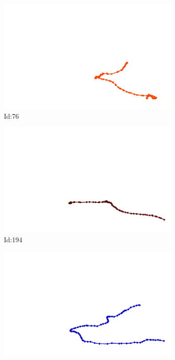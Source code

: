 \documentclass[12pt,twoside]{report}
\begin{document}
\begin{figure}
\centering
\begin{subfigure}[b]{0.20\textwidth}
\centering
\includegraphics[width=\textwidth]{../trajectories/76.png}
\caption{Id:76}
\end{subfigure}
\begin{subfigure}[b]{0.20\textwidth}
\centering
\includegraphics[width=\textwidth]{../trajectories/194.png}
\caption{Id:194}
\end{subfigure}
\begin{subfigure}[b]{0.20\textwidth}
\centering
\includegraphics[width=\textwidth]{../trajectories/298.png}

\end{subfigure}
\end{figure}
\end{document}
